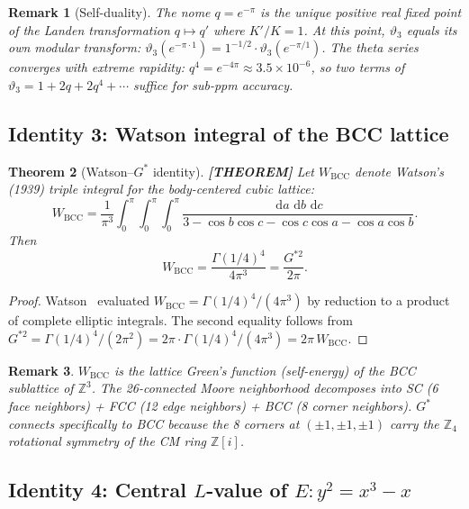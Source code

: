 \documentclass[11pt]{article}
\theoremstyle{tight}
\newtheorem{theorem}{Theorem}[section]
\theoremstyle{plainroman}
\newtheorem{remark}[theorem]{Remark}
\newcommand{\Z}{\mathbb{Z}}
\newcommand{\dd}{\,\mathrm{d}}
\begin{document}
\begin{remark}[Self-duality]\label{rem:selfdual}
The nome $q=e^{-\pi}$ is the unique positive real fixed point of the Landen transformation $q\mapsto q'$ where $K'/K=1$.
At this point, $\vartheta_3$ equals its own modular transform: $\vartheta_3(e^{-\pi\cdot 1})=1^{-1/2}\cdot\vartheta_3(e^{-\pi/1})$.
The theta series converges with extreme rapidity: $q^4=e^{-4\pi}\approx 3.5\times 10^{-6}$, so two terms of $\vartheta_3=1+2q+2q^4+\cdots$ suffice for sub-ppm accuracy.
\end{remark}

\subsection{Identity 3: Watson integral of the BCC lattice}

\begin{theorem}[Watson--$G^*$ identity]\label{thm:watson}
\textbf{[THEOREM]}
Let $W_{\mathrm{BCC}}$ denote Watson's (1939) triple integral for the body-centered cubic lattice:
\[
W_{\mathrm{BCC}}=\frac{1}{\pi^3}\int_0^\pi\!\!\int_0^\pi\!\!\int_0^\pi\frac{\dd a\,\dd b\,\dd c}{3-\cos b\cos c-\cos c\cos a-\cos a\cos b}.
\]
Then
\begin{equation}\label{eq:watson}
W_{\mathrm{BCC}}=\frac{\Gamma(1/4)^4}{4\pi^3}=\frac{G^{*2}}{2\pi}.
\end{equation}
\end{theorem}
\begin{proof}
Watson~\cite{watson1939} evaluated $W_{\mathrm{BCC}}=\Gamma(1/4)^4/(4\pi^3)$ by reduction to a product of complete elliptic integrals.
The second equality follows from $G^{*2}=\Gamma(1/4)^4/(2\pi^2)=2\pi\cdot\Gamma(1/4)^4/(4\pi^3)=2\pi\,W_{\mathrm{BCC}}$.
\end{proof}

\begin{remark}
$W_{\mathrm{BCC}}$ is the lattice Green's function (self-energy) of the BCC sublattice of $\Z^3$.
The 26-connected Moore neighborhood decomposes into SC (6 face neighbors) + FCC (12 edge neighbors) + BCC (8 corner neighbors).
$G^*$ connects specifically to BCC because the 8 corners at $(\pm 1,\pm 1,\pm 1)$ carry the $\Z_4$ rotational symmetry of the CM ring $\Z[i]$.
\end{remark}

\subsection{Identity 4: Central $L$-value of $E:y^2=x^3-x$}
\end{document}
